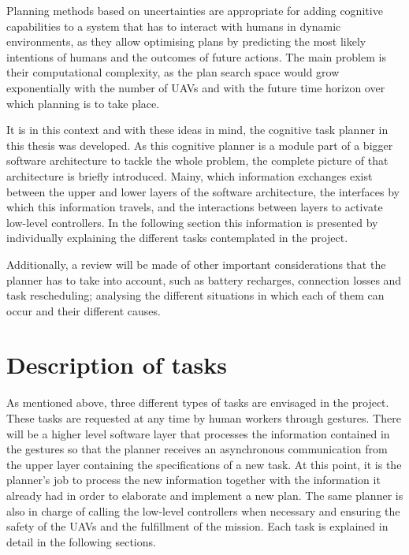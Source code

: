 Planning methods based on uncertainties are appropriate for adding cognitive capabilities to a system that has to interact with humans in dynamic environments, as they allow optimising plans by predicting the most likely intentions of humans and the outcomes of future actions. The main problem is their computational complexity, as the plan search space would grow exponentially with the number of \glspl{UAV} and with the future time horizon over which planning is to take place.

It is in this context and with these ideas in mind, the cognitive task planner in this thesis was developed. As this cognitive planner is a module part of a bigger software architecture to tackle the whole problem, the complete picture of that architecture is briefly introduced. Mainy, which information exchanges exist between the upper and lower layers of the software architecture, the interfaces by which this information travels, and the interactions between layers to activate low-level controllers. In the following section this information is presented by individually explaining the different tasks contemplated in the project. 

Additionally, a review will be made of other important considerations that the planner has to take into account, such as battery recharges, connection losses and task rescheduling; analysing the different situations in which each of them can occur and their different causes. 

\section{Description of tasks}
\label{sec:DescriptionOfTasks}
As mentioned above, three different types of tasks are envisaged in the project. These tasks are requested at any time by human workers through gestures. There will be a higher level software layer that processes the information contained in the gestures so that the planner receives an asynchronous communication from the upper layer containing the specifications of a new task. At this point, it is the planner's job to process the new information together with the information it already had in order to elaborate and implement a new plan. The same planner is also in charge of calling the low-level controllers when necessary and ensuring the safety of the \glspl{UAV} and the fulfillment of the mission. Each task is explained in detail in the following sections.

